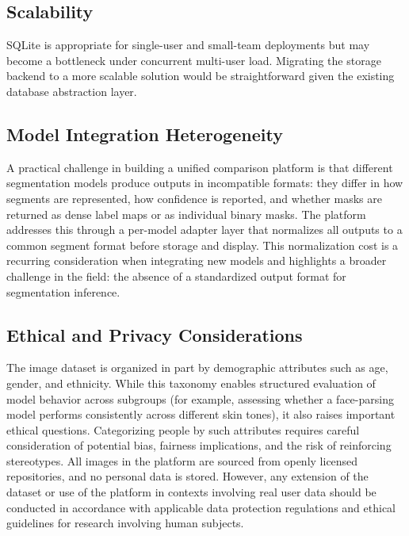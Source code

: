 \documentclass[conference,a4paper,flushend]{iaria}
\begin{document}
\subsection{Scalability}

SQLite is appropriate for single-user and small-team deployments but may become a bottleneck under concurrent multi-user load. Migrating the storage backend to a more scalable solution would be straightforward given the existing database abstraction layer.

\subsection{Model Integration Heterogeneity}

A practical challenge in building a unified comparison platform is that different segmentation models produce outputs in incompatible formats: they differ in how segments are represented, how confidence is reported, and whether masks are returned as dense label maps or as individual binary masks. The platform addresses this through a per-model adapter layer that normalizes all outputs to a common segment format before storage and display. This normalization cost is a recurring consideration when integrating new models and highlights a broader challenge in the field: the absence of a standardized output format for segmentation inference.

\subsection{Ethical and Privacy Considerations}

The image dataset is organized in part by demographic attributes such as age, gender, and ethnicity. While this taxonomy enables structured evaluation of model behavior across subgroups (for example, assessing whether a face-parsing model performs consistently across different skin tones), it also raises important ethical questions. Categorizing people by such attributes requires careful consideration of potential bias, fairness implications, and the risk of reinforcing stereotypes. All images in the platform are sourced from openly licensed repositories, and no personal data is stored. However, any extension of the dataset or use of the platform in contexts involving real user data should be conducted in accordance with applicable data protection regulations and ethical guidelines for research involving human subjects.

\end{document}
